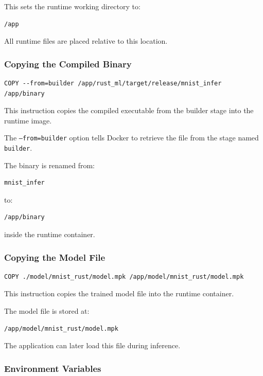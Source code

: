 \documentclass[11pt,a4paper]{article}
\begin{document}
This sets the runtime working directory to:

\begin{verbatim}
/app
\end{verbatim}

All runtime files are placed relative to this location.

\subsubsection{Copying the Compiled Binary}

\begin{verbatim}
COPY --from=builder /app/rust_ml/target/release/mnist_infer /app/binary
\end{verbatim}

This instruction copies the compiled executable from the builder stage into the runtime image.

The \texttt{--from=builder} option tells Docker to retrieve the file from the stage named \texttt{builder}.

The binary is renamed from:

\begin{verbatim}
mnist_infer
\end{verbatim}

to:

\begin{verbatim}
/app/binary
\end{verbatim}

inside the runtime container.

\subsubsection{Copying the Model File}

\begin{verbatim}
COPY ./model/mnist_rust/model.mpk /app/model/mnist_rust/model.mpk
\end{verbatim}

This instruction copies the trained model file into the runtime container.

The model file is stored at:

\begin{verbatim}
/app/model/mnist_rust/model.mpk
\end{verbatim}

The application can later load this file during inference.

\subsubsection{Environment Variables}
\end{document}
